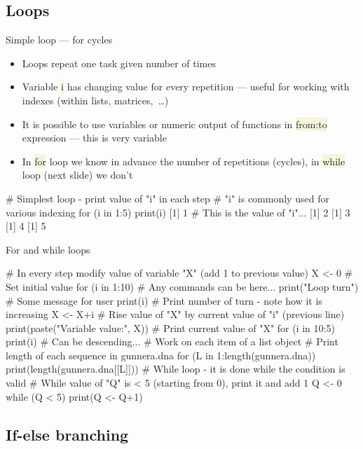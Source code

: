 \documentclass[compress, xelatex, 11pt, xcolor=svgnames, aspectratio=169,
	hyperref={
		bookmarks=true,
		unicode=true,
		colorlinks=true,
		pdftitle={Molecular data in R},
		plainpages=false,
		pdfauthor={Vojtech Zeisek},
		pdfsubject={Course about phylogeny and evolution in R},
		pdfcreator={XeLaTeX},
		pdfkeywords={R, evolution, phylogeny, molecular data},
		linkcolor=Crimson, %
		anchorcolor=Magenta, %
		citecolor=Magenta, %
		filecolor=Magenta, %
		menucolor=Magenta, %
		urlcolor=DodgerBlue, %
		},
	url={hyphens, lowtilde} %
	]{beamer}
\renewcommand{\texttt}[1]{\colorbox{Beige}{{\ttfamily #1}}}
\begin{document}
\subsection{Loops}

\begin{frame}[fragile]{Simple loop --- for cycles}
	\begin{itemize}
		\item Loops repeat one task given number of times
		\item Variable \texttt{i} has changing value for every repetition --- useful for working with indexes (within lists, matrices,~\ldots)
		\item It is possible to use variables or numeric output of functions in \texttt{from:to} expression --- this is very variable
		\item In \texttt{for} loop we know in advance the number of repetitions (cycles), in \texttt{while} loop (next slide) we don't
	\end{itemize}
	\begin{spluscode}
    # Simplest loop - print value of "i" in each step
    # "i" is commonly used for various indexing
    for (i in 1:5) { print(i) }
    [1] 1 # This is the value of "i"...
    [1] 2
    [1] 3
    [1] 4
    [1] 5
	\end{spluscode}
\end{frame}

\begin{frame}[fragile]{For and while loops}
	\begin{spluscode}
    # In every step modify value of variable "X" (add 1 to previous value)
    X <- 0 # Set initial value
    for (i in 1:10) {
      # Any commands can be here...
      print("Loop turn") # Some message for user
      print(i) # Print number of turn - note how it is increasing
      X <- X+i # Rise value of "X" by current value of "i" (previous line)
      print(paste("Variable value:", X)) } # Print current value of "X"
    for (i in 10:5) { print(i) } # Can be descending...
    # Work on each item of a list object
    # Print length of each sequence in gunnera.dna
    for (L in 1:length(gunnera.dna)) {
      print(length(gunnera.dna[[L]])) }
    # While loop - it is done while the condition is valid
    # While value of "Q" is < 5 (starting from 0), print it and add 1
    Q <- 0
    while (Q < 5) { print(Q <- Q+1) }
	\end{spluscode}
\end{frame}

\subsection{If-else branching}
\end{document}

